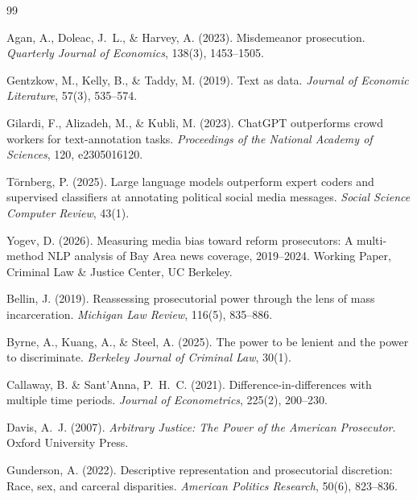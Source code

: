 \documentclass[12pt]{article}
\begin{document}


\begin{thebibliography}{99}

Agan, A., Doleac, J.~L., \& Harvey, A. (2023).
\newblock Misdemeanor prosecution.
\newblock \textit{Quarterly Journal of Economics}, 138(3), 1453--1505.

Gentzkow, M., Kelly, B., \& Taddy, M. (2019).
\newblock Text as data.
\newblock \textit{Journal of Economic Literature}, 57(3), 535--574.

Gilardi, F., Alizadeh, M., \& Kubli, M. (2023).
\newblock ChatGPT outperforms crowd workers for text-annotation tasks.
\newblock \textit{Proceedings of the National Academy of Sciences}, 120, e2305016120.

T\"{o}rnberg, P. (2025).
\newblock Large language models outperform expert coders and supervised classifiers at annotating political social media messages.
\newblock \textit{Social Science Computer Review}, 43(1).

Yogev, D. (2026).
\newblock Measuring media bias toward reform prosecutors: A multi-method NLP analysis of Bay Area news coverage, 2019--2024.
\newblock Working Paper, Criminal Law \& Justice Center, UC Berkeley.

Bellin, J. (2019).
\newblock Reassessing prosecutorial power through the lens of mass incarceration.
\newblock \textit{Michigan Law Review}, 116(5), 835--886.

Byrne, A., Kuang, A., \& Steel, A. (2025).
\newblock The power to be lenient and the power to discriminate.
\newblock \textit{Berkeley Journal of Criminal Law}, 30(1).

Callaway, B. \& Sant'Anna, P.~H.~C. (2021).
\newblock Difference-in-differences with multiple time periods.
\newblock \textit{Journal of Econometrics}, 225(2), 200--230.

Davis, A.~J. (2007).
\newblock \textit{Arbitrary Justice: The Power of the American Prosecutor}.
\newblock Oxford University Press.

Gunderson, A. (2022).
\newblock Descriptive representation and prosecutorial discretion: Race, sex, and carceral disparities.
\newblock \textit{American Politics Research}, 50(6), 823--836.


\end{thebibliography}
\end{document}
